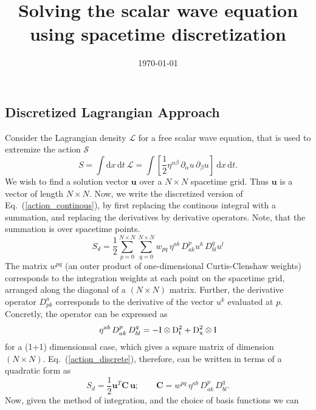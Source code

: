 \documentclass[nofootinbib,preprintnumbers,superscriptaddress,notitlepage]{revtex4-1}
\newcommand{\<}{\begin{equation}}
\newcommand{\?}{\end{equation}}
\begin{document}
\title{Solving the scalar wave equation using spacetime discretization}
\date{\today}
\maketitle
\subsection{Discretized Lagrangian Approach}
Consider the Lagrangian density $\mathcal{L}$ for a free scalar wave equation,
that is used to extremize the action $\mathcal{S}$
\begin{equation}
\label{action_continous}
S = \int \textrm{d}x\,\textrm{d}t~\mathcal{L} =  \int  \left[\dfrac{1}{2}
\eta^{\alpha \beta}\, \partial_{\alpha} u\, \partial_{\beta} u\right]~
\textrm{d}x\,\textrm{d}t.
\end{equation}
We wish to find a solution vector $\mathbf{u}$ over a $N\times N$ spacetime
grid. Thus $\mathbf{u}$ is a vector of length $N\times N$. Now, we write the
discretized version of Eq.~(\ref{action_continous}), by first replacing the
continous integral with a summation, and replacing the derivatives by
derivative operators. Note, that the summation is over spacetime points.
\begin{equation}
\label{action_discrete}
S_d = \dfrac{1}{2} \sum\limits_{p=0}^{N\times N}\sum\limits_{q=0}^{N\times N} w_{pq}\, \eta^{ab} \, D_{ak}^p u^{k}\, D_{bl}^q u^{l} 
\end{equation}
The matrix $w^{pq}$ (an outer product of one-dimensional Curtis-Clenshaw
weights) corresponds to the integration weights at each point on the spacetime
grid, arranged along the diagonal of a $(N\times N)$ matrix. Further, the
derivative operator $D^a_{pk}$ corresponds to the derivative of the vector
$u^k$ evaluated at $p$. Concretly, the operator can be expressed as
\begin{equation}
\eta^{ab} \, D_{ak}^p\, D_{bl}^q = - \rm{I}\otimes D_t^2 +  D_x^2\otimes\rm{I}
\end{equation}
for a (1+1) dimensionsal case, which gives a square matrix of dimension
$(N\times N)$. Eq.~(\ref{action_discrete}), therefore, can be written in terms
of a quadratic form as
\begin{equation}
S_d = \dfrac{1}{2} \mathbf{u}^T \mathbf{C}\, \mathbf{u}; \qquad \mathbf{C} = w^{pq}\, \eta^{ab} \, D_{ak}^p \, D_{bl}^q.
\end{equation}
Now, given the method of integration, and the choice of basis functions we can
\end{document}
